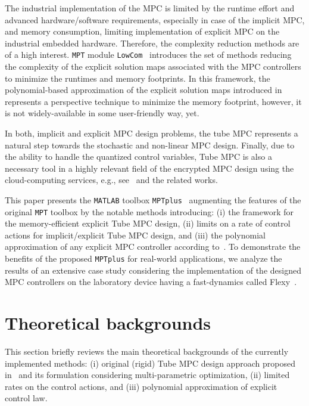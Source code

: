 \documentclass[letterpaper, 10 pt, conference]{ieeeconf}
\begin{document}
The industrial implementation of the MPC is limited by the runtime effort and advanced hardware/software requirements, especially in case of the implicit MPC, and memory consumption, limiting implementation of explicit MPC on the industrial embedded hardware. Therefore, the complexity reduction methods are of a high interest. 
\texttt{MPT} module \texttt{LowCom}~\cite{KH15} introduces the set of methods reducing the complexity of the explicit solution maps associated with the MPC controllers to minimize the runtimes and memory footprints. 
In this framework, the polynomial-based approximation of the explicit solution maps introduced in~\cite{KL11} represents a perspective technique to minimize the memory footprint, however, it is not widely-available in some user-friendly way, yet.

In both, implicit and explicit MPC design problems, the tube MPC represents a natural step towards the stochastic and non-linear MPC design. Finally, due to the ability to handle the quantized control variables, Tube MPC is also a necessary tool in a highly relevant field of the encrypted MPC design using the cloud-computing services, e.g., see~\cite{DR18} and the related works.

This paper presents the \texttt{MATLAB} toolbox \texttt{MPTplus}~\cite{MPTplus} augmenting the features of the original \texttt{MPT} toolbox by the notable methods introducing: (i) the framework for the memory-efficient explicit Tube MPC design, (ii) limits on a rate of control actions for implicit/explicit Tube MPC design, and (iii) the polynomial approximation of any explicit MPC controller according to~\cite{KL11}. To demonstrate the benefits of the proposed \texttt{MPTplus} for real-world applications, we analyze the results of an extensive case study considering the implementation of the designed MPC controllers on the laboratory device having a fast-dynamics called Flexy~\cite{CK19}. 

\section{Theoretical backgrounds}
\label{sec:tube_mpc_theory}

This section briefly reviews the main theoretical backgrounds of the currently implemented methods: (i) original (rigid) Tube MPC design approach proposed in~\cite{MS05} and its formulation considering multi-parametric optimization, (ii) limited rates on the control actions, and (iii) polynomial approximation of explicit control law.
\end{document}
